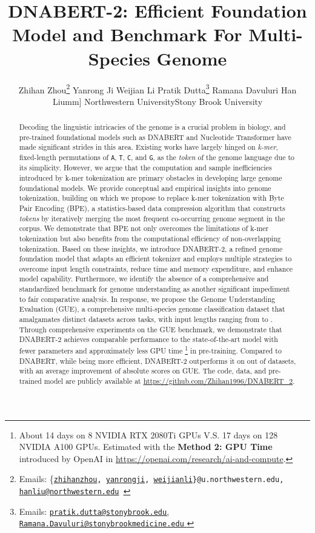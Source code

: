 \documentclass{article}
\title{DNABERT-2: Efficient Foundation Model and Benchmark For Multi-Species Genome}
\author{
  Zhihan Zhou\thanks{Emails: {\{\tt \href{mailto:zhihanzhou@u.northwestern.edu}{zhihanzhou},  \href{mailto:yanrongji2021@u.northwestern.edu}{yanrongji},    \href{mailto:weijianli@u.northwestern.edu}{weijianli}\}@u.northwestern.edu, \href{mailto:hanliu@northwestern.edu}{\texttt{hanliu@northwestern.edu}}
  }}
  \quad 
  Yanrong Ji\footnotemark[1]
  \quad
  Weijian Li\footnotemark[1]
  \quad
  Pratik Dutta\thanks{Emails: \href{mailto:pratik.dutta@stonybrook.edu}{\texttt{pratik.dutta@stonybrook.edu}, \quad \href{mailto:Ramana.Davuluri@stonybrookmedicine.edu}{\texttt{Ramana.Davuluri@stonybrookmedicine.edu}
  }}}
  \quad
  Ramana Davuluri\footnotemark[2]
  \quad
  Han Liu\2mm]
  Northwestern University\footnotemark[1] \qquad Stony Brook University\footnotemark[2]
}
\begin{document}
\maketitle
\setcounter{footnote}{0}  



\begin{abstract}
Decoding the linguistic intricacies  of the genome is a crucial problem in biology, and pre-trained foundational models such as DNABERT and Nucleotide Transformer have made significant strides in this area. Existing works have largely hinged on \textit{k-mer}, fixed-length permutations of \texttt{A}, \texttt{T}, \texttt{C}, and \texttt{G}, as the \textit{token} of the genome language due to its simplicity. However, we argue that the computation and sample inefficiencies introduced by k-mer tokenization are primary obstacles in developing large genome foundational models. We provide conceptual and empirical insights into genome tokenization, building on which we propose to replace k-mer tokenization with Byte Pair Encoding (BPE), a statistics-based data compression algorithm that constructs \textit{tokens} by iteratively merging the most frequent co-occurring genome segment in the corpus. We demonstrate that BPE not only overcomes the limitations of k-mer tokenization but also benefits from the computational efficiency of non-overlapping tokenization.
Based on these insights, we introduce DNABERT-2, a refined genome foundation model that adapts an efficient tokenizer and employs multiple strategies to overcome input length constraints, reduce time and memory expenditure, and enhance model capability. Furthermore, we identify the absence of a comprehensive and standardized benchmark for genome understanding as another significant impediment to fair comparative analysis. In response, we propose the Genome Understanding Evaluation (GUE), a comprehensive multi-species genome classification dataset that amalgamates  distinct datasets across  tasks, with input lengths ranging from  to . Through comprehensive experiments on the GUE benchmark, we demonstrate that DNABERT-2 achieves comparable performance to the state-of-the-art model with  fewer parameters and approximately  less GPU time \footnote{About 14 days on 8 NVIDIA RTX 2080Ti GPUs V.S. 17 days on 128 NVIDIA A100 GPUs. Estimated with the \textbf{Method 2: GPU Time} introduced by OpenAI in \url{https://openai.com/research/ai-and-compute}.} in pre-training. 
Compared to DNABERT, while being  more efficient, DNABERT-2 outperforms it on  out of  datasets, with an average improvement of  absolute scores on GUE.
The code, data, and pre-trained model are publicly available at \url{https://github.com/Zhihan1996/DNABERT_2}. 

\end{abstract}
\end{document}
